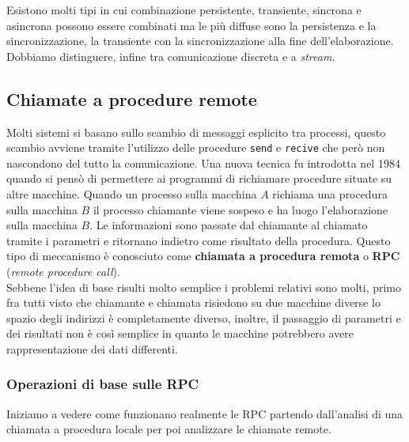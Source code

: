 Esistono molti tipi in cui combinazione persistente, transiente, sincrona e asincrona possono essere combinati ma le più diffuse sono la persistenza e la sincronizzazione, la transiente con la sincronizzazione alla fine dell'elaborazione.\\
Dobbiamo distinguere, infine tra comunicazione discreta e a \emph{stream}.
\subsection{Chiamate a procedure remote}
Molti sistemi si basano sullo scambio di messaggi esplicito tra processi, questo scambio avviene tramite l'utilizzo delle procedure \texttt{send} e \texttt{recive} che però non nascondono del tutto la comunicazione. Una nuova tecnica fu introdotta nel 1984 quando si pensò di permettere ai programmi di richiamare procedure situate su altre macchine. Quando un processo sulla macchina $A$ richiama una procedura sulla macchina $B$ il processo chiamante viene sospeso e ha luogo l'elaborazione sulla macchina $B$. Le informazioni sono passate dal chiamante al chiamato tramite i parametri e ritornano indietro come risultato della procedura. Questo tipo di meccanismo è conosciuto come \textbf{chiamata a procedura remota } o \textbf{RPC} (\emph{remote procedure call}).\\
Sebbene l'idea di base risulti molto semplice i problemi relativi sono molti, primo fra tutti visto che chiamante e chiamata risiedono su due macchine diverse lo spazio degli indirizzi è completamente diverso, inoltre, il passaggio di parametri e dei risultati non è così semplice in quanto le macchine potrebbero avere rappresentazione dei dati differenti.
\subsubsection{Operazioni di base sulle RPC}
Iniziamo a vedere come funzionano realmente le RPC partendo dall'analisi di una chiamata a procedura locale per poi analizzare le chiamate remote.
